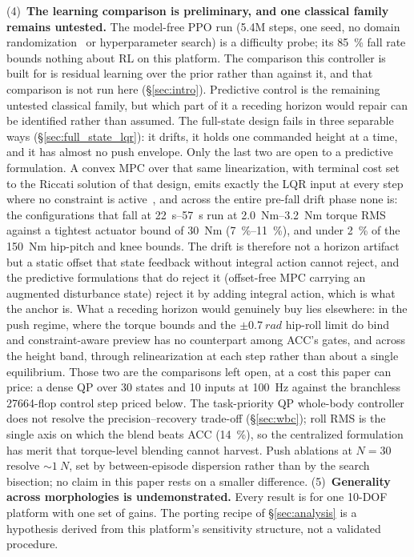 \documentclass[conference]{IEEEtran}
\begin{document}
(4)~\textbf{The learning comparison is preliminary, and one classical family remains untested.} The model-free PPO run (5.4M steps, one seed, no domain randomization~\cite{tobin2017domainrand,peng2018dynrand} or hyperparameter search) is a difficulty probe; its \SI{85}{\percent} fall rate bounds nothing about RL on this platform. The comparison this controller is built for is residual learning over the prior rather than against it, and that comparison is not run here (\S\ref{sec:intro}). Predictive control is the remaining untested classical family, but which part of it a receding horizon would repair can be identified rather than assumed. The full-state design fails in three separable ways (\S\ref{sec:full_state_lqr}): it drifts, it holds one commanded height at a time, and it has almost no push envelope. Only the last two are open to a predictive formulation. A convex MPC over that same linearization, with terminal cost set to the Riccati solution of that design, emits exactly the LQR input at every step where no constraint is active~\cite{rawlings2017mpc}, and across the entire pre-fall drift phase none is: the configurations that fall at \SIrange{22}{57}{s} run at \SIrange{2.0}{3.2}{Nm} torque RMS against a tightest actuator bound of \SI{30}{Nm} (\SIrange{7}{11}{\percent}), and under \SI{2}{\percent} of the \SI{150}{Nm} hip-pitch and knee bounds. The drift is therefore not a horizon artifact but a static offset that state feedback without integral action cannot reject, and the predictive formulations that do reject it (offset-free MPC carrying an augmented disturbance state) reject it by adding integral action, which is what the anchor is. What a receding horizon would genuinely buy lies elsewhere: in the push regime, where the torque bounds and the $\pm\SI{0.7}{rad}$ hip-roll limit do bind and constraint-aware preview has no counterpart among ACC's gates, and across the height band, through relinearization at each step rather than about a single equilibrium. Those two are the comparisons left open, at a cost this paper can price: a dense QP over \num{30} states and \num{10} inputs at \SI{100}{Hz} against the branchless \num{27664}-flop control step priced below. The task-priority QP whole-body controller does not resolve the precision--recovery trade-off (\S\ref{sec:wbc}); roll RMS is the single axis on which the blend beats ACC (\SI{14}{\percent}), so the centralized formulation has merit that torque-level blending cannot harvest. Push ablations at $N{=}30$ resolve ${\sim}\SI{1}{N}$, set by between-episode dispersion rather than by the search bisection; no claim in this paper rests on a smaller difference.
(5)~\textbf{Generality across morphologies is undemonstrated.} Every result is for one 10-DOF platform with one set of gains. The porting recipe of \S\ref{sec:analysis} is a hypothesis derived from this platform's sensitivity structure, not a validated procedure.
\end{document}

